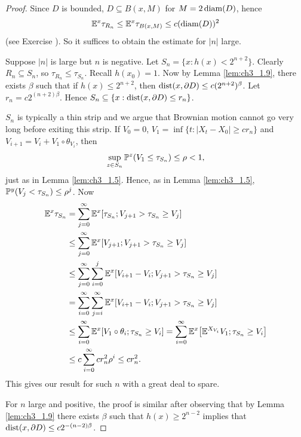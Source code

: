 \begin{proof}
Since $D$ is bounded, $D \subseteq B(x,M)$ for $M = 2\diam(D)$, hence
\begin{equation}\label{eq:ch3_3.2}
    \E^x\tau_{R_n} \leq \E^x\tau_{B(x,M)} \leq c(\diam(D))^2
\end{equation}
(see Exercise ). So it suffices to obtain the estimate for $|n|$ large.

Suppose $|n|$ is large but $n$ is negative. Let $S_n = \{x : h(x) < 2^{n+2}\}$. Clearly $R_n \subseteq S_n$, so $\tau_{R_n} \leq \tau_{S_n}$. Recall $h(x_0) = 1$. Now by Lemma \ref{lem:ch3_1.9}, there exists $\beta$ such that if $h(x) \leq 2^{n+2}$, then $\dist(x,\partial D) \leq c(2^{n+2})^\beta$. Let $r_n = c2^{(n+2)\beta}$. Hence $S_n \subseteq \{x : \dist(x,\partial D) \leq r_n\}$.

$S_n$ is typically a thin strip and we argue that Brownian motion cannot go very long before exiting this strip. If $V_0 = 0$, $V_1 = \inf\{t : |X_t-X_0| \geq cr_n\}$ and $V_{i+1} = V_i + V_1 \circ \theta_{V_i}$, then
\[
    \sup_{z\in S_n} \P^z(V_1 \leq \tau_{S_n}) \leq \rho < 1,
\]
just as in Lemma \ref{lem:ch3_1.5}. Hence, as in Lemma \ref{lem:ch3_1.5}, $\P^y(V_j < \tau_{S_n}) \leq \rho^j$. Now
\begin{align}\label{eq:ch3_3.3}
    \E^x\tau_{S_n} &= \sum_{j=0}^\infty \E^x[\tau_{S_n}; V_{j+1} > \tau_{S_n} \geq V_j] \\
    &\leq \sum_{j=0}^\infty \E^x[V_{j+1}; V_{j+1} > \tau_{S_n} \geq V_j] \notag \\
    &\leq \sum_{j=0}^{\infty} \sum_{i=0}^j \E^x[V_{i+1} - V_i; V_{j+1} > \tau_{S_n} \geq V_j] \notag \\
    &= \sum_{i=0}^{\infty} \sum_{j=i}^{\infty} \E^x[V_{i+1} - V_i; V_{j+1} > \tau_{S_n} \geq V_j] \notag \\
    &\leq \sum_{i=0}^{\infty} \E^x[V_1 \circ \theta_i; \tau_{S_n} \geq V_i] = \sum_{i=0}^{\infty} \E^x\big[\E^{X_{V_i}}V_1; \tau_{S_n} \geq V_i\big ] \notag \\
    &\leq c\sum_{i=0}^{\infty} cr_n^2\rho^i \leq cr_n^2. \notag
\end{align}
\mnewpage
This gives our result for such $n$ with a great deal to spare.

For $n$ large and positive, the proof is similar after observing that by Lemma \ref{lem:ch3_1.9} there exists $\beta$ such that $h(x) \geq 2^{n-2}$ implies that $\dist(x,\partial D) \leq c2^{-(n-2)\beta}$.
\end{proof}

